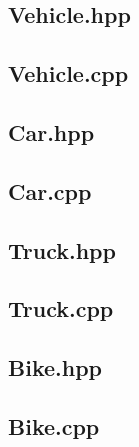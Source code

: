 \documentclass[12pt,naustrian,a4widepaper]{scrartcl}
\begin{document}
\subsection{Vehicle.hpp}


\subsection{Vehicle.cpp}


\subsection{Car.hpp}


\subsection{Car.cpp}


\subsection{Truck.hpp}


\subsection{Truck.cpp}


\subsection{Bike.hpp}


\subsection{Bike.cpp}


%


\end{document}
